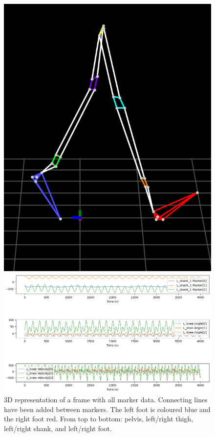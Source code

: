 \begin{figure}[ht]
    \centering
    \begin{minipage}[t]{0.48\textwidth}
        \centering
        \includegraphics[width=\textwidth]{images/ex_3d_marker.png}
        \caption{3D representation of a frame with all marker data. Connecting lines have been added between markers. The left foot is coloured blue and the right foot red. From top to bottom: pelvis, left/right thigh, left/right shank, and left/right foot.}
        \label{fig:data-ext-marker-3d}
    \end{minipage}
    \hfill
    \begin{minipage}[t]{0.48\textwidth}
        \centering
        \includegraphics[width=\textwidth]{images/ex_marker_angle_vel_ts.png}

\end{minipage}
\end{figure}
